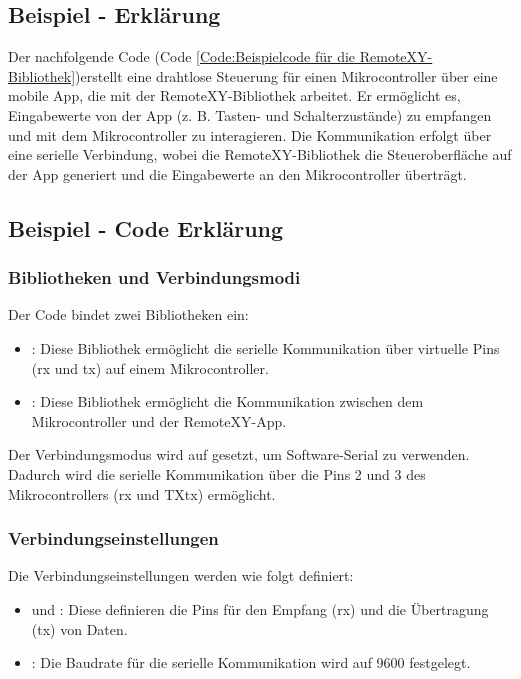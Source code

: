 \subsection{Beispiel - Erklärung}

Der nachfolgende Code (Code \ref{Code:Beispielcode für die RemoteXY-Bibliothek})erstellt eine drahtlose Steuerung für einen Mikrocontroller über eine mobile App, die mit der RemoteXY-Bibliothek arbeitet. Er ermöglicht es, Eingabewerte von der App (z. B. Tasten- und Schalterzustände) zu empfangen und mit dem Mikrocontroller zu interagieren. Die Kommunikation erfolgt über eine serielle Verbindung, wobei die RemoteXY-Bibliothek die Steueroberfläche auf der App generiert und die Eingabewerte an den Mikrocontroller überträgt.


\subsection{Beispiel - Code Erklärung}

	\subsubsection{Bibliotheken und Verbindungsmodi}
	Der Code bindet zwei Bibliotheken ein:
	\begin{itemize}
		\item {}: Diese Bibliothek ermöglicht die serielle Kommunikation über virtuelle Pins (\ac{rx} und \ac{tx}) auf einem Mikrocontroller.
		\item {}: Diese Bibliothek ermöglicht die Kommunikation zwischen dem Mikrocontroller und der RemoteXY-App.
	\end{itemize}
	Der Verbindungsmodus wird auf  gesetzt, um Software-Serial zu verwenden. Dadurch wird die serielle Kommunikation über die Pins 2 und 3 des Mikrocontrollers (\ac{rx} und TX\ac{tx}) ermöglicht.

	\subsubsection{Verbindungseinstellungen}
	Die Verbindungseinstellungen werden wie folgt definiert:
	\begin{itemize}
		\item {} und : Diese definieren die Pins für den Empfang (\ac{rx}) und die Übertragung (\ac{tx}) von Daten.
		\item {}: Die Baudrate für die serielle Kommunikation wird auf 9600 festgelegt.
	\end{itemize}

